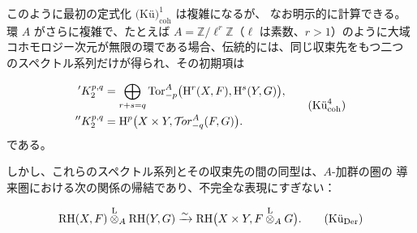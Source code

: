 このように最初の定式化 $\text{(Kü)}_{\mathrm{coh}}^{1}$ は複雑になるが、
なお明示的に計算できる。環 $A$ がさらに複雑で、たとえば
$A=\mathbb Z/\ell^r\mathbb Z$（$\ell$ は素数、$r>1$）のように大域
コホモロジー次元が無限の環である場合、伝統的には、同じ収束先をもつ二つ
のスペクトル系列だけが得られ、その初期項は

\begin{equation}
\begin{aligned}
{}'K_2^{p,q}
  &=\bigoplus_{r+s=q}
    \operatorname{Tor}_{-p}^{A}
    \bigl(\mathrm H^r(X,F),\mathrm H^s(Y,G)\bigr), \\
{}''K_2^{p,q}
  &=\mathrm H^p\bigl(X\times Y,\mathcal T\!or_{-q}^{A}(F,G)\bigr).
\end{aligned}
\tag{$\text{Kü}_{\mathrm{coh}}^{4}$}
\end{equation}
である。

しかし、これらのスペクトル系列とその収束先の間の同型は、$A$-加群の圏の
導来圏における次の関係の帰結であり、不完全な表現にすぎない：

\begin{equation}
\mathrm{RH}(X,F)\overset{\mathrm L}{\otimes}_A\mathrm{RH}(Y,G)
\xrightarrow{\sim}
\mathrm{RH}\bigl(X\times Y,F\overset{\mathrm L}{\otimes}_A G\bigr).
\tag{$\text{Kü}_{\mathrm{Der}}$}
\end{equation}
